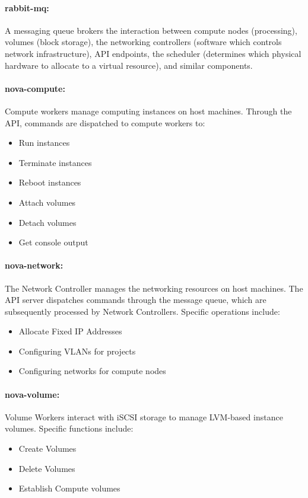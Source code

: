 \paragraph{rabbit-mq:}A messaging queue brokers the interaction between compute nodes (processing), volumes (block storage),
 the networking controllers (software which controls network infrastructure), 
API endpoints, the scheduler (determines which physical hardware to allocate to a virtual resource), and similar components.
\paragraph{nova-compute:}Compute workers manage computing instances on host machines. Through the API, commands are dispatched to compute workers to:
\begin{itemize}
 \item Run instances
 \item Terminate instances
 \item Reboot instances
 \item Attach volumes
 \item Detach volumes
 \item Get console output
\end{itemize}

\paragraph{nova-network:}The Network Controller manages the networking resources on host machines. The API server dispatches commands through the message queue, 
which are subsequently processed by Network Controllers. Specific operations include:
\begin {itemize}
 \item Allocate Fixed IP Addresses
 \item Configuring VLANs for projects
 \item Configuring networks for compute nodes
\end {itemize}

\paragraph{nova-volume:}Volume Workers interact with iSCSI storage to manage LVM-based instance volumes. Specific functions include:
\begin {itemize}
 \item Create Volumes
 \item Delete Volumes
 \item Establish Compute volumes
\end {itemize}
